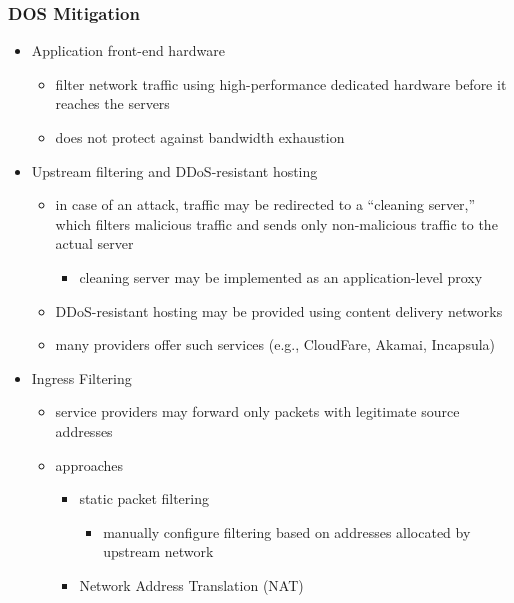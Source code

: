 \documentclass[final]{article}
\begin{document}
\subsubsection*{DOS Mitigation}
\begin{itemize}
    \item Application front-end hardware
          \begin{itemize}[nosep]
              \item filter network traffic using high-performance dedicated hardware before it reaches the servers
              \item does not protect against bandwidth exhaustion
          \end{itemize}
    \item Upstream filtering and DDoS-resistant hosting
          \begin{itemize}[nosep]
              \item in case of an attack, traffic may be redirected to a ``cleaning server,'' which filters malicious traffic and sends only non-malicious traffic to the actual server
                    \begin{itemize}[nosep]
                        \item cleaning server may be implemented as an application-level proxy
                    \end{itemize}
              \item DDoS-resistant hosting may be provided using content delivery networks
              \item many providers offer such services (e.g., CloudFare, Akamai, Incapsula)
          \end{itemize}
    \item Ingress Filtering
          \begin{itemize}[nosep]
              \item service providers may forward only packets with legitimate source addresses
              \item approaches
                    \begin{itemize}[nosep]
                        \item static packet filtering
                              \begin{itemize}[nosep]
                                  \item manually configure filtering based on addresses allocated by upstream network
                              \end{itemize}
                        \item Network Address Translation (NAT)

\end{itemize}
\end{itemize}
\end{itemize}
\end{document}
